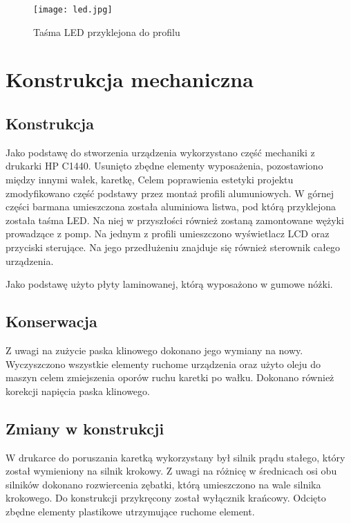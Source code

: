 \documentclass[10pt, a4paper]{article}
\begin{document}
\begin{figure}[H]
	\centering
	\texttt{[image: led.jpg]}
	\caption{Taśma LED przyklejona do profilu}
	\label{fig:LED}
\end{figure}




\section{Konstrukcja mechaniczna}

\subsection{Konstrukcja}
Jako podstawę do stworzenia urządzenia wykorzystano część mechaniki z drukarki HP C1440. Usunięto zbędne elementy wyposażenia, pozostawiono między innymi wałek, karetkę, Celem poprawienia estetyki projektu zmodyfikowano część podstawy przez montaż profili alumuniowych. W górnej części barmana umieszczona została aluminiowa listwa, pod którą przyklejona została taśma LED. Na niej w przyszłości również zostaną zamontowane wężyki prowadzące z pomp. 
Na jednym z profili umieszczono wyświetlacz LCD oraz przyciski sterujące. Na jego przedłużeniu znajduje się również sterownik całego urządzenia.

Jako podstawę użyto płyty laminowanej, którą wyposażono w gumowe nóżki. 

\subsection{Konserwacja}
Z uwagi na zużycie paska klinowego dokonano jego wymiany na nowy. Wyczyszczono wszystkie elementy ruchome urządzenia oraz użyto oleju do maszyn celem zmiejszenia oporów ruchu karetki po wałku. Dokonano również korekcji napięcia paska klinowego. 

\subsection{Zmiany w konstrukcji}
W drukarce do poruszania karetką wykorzystany był silnik prądu stałego, który został wymieniony na silnik krokowy. Z uwagi na różnicę w średnicach osi obu silników dokonano rozwiercenia zębatki, którą umieszczono na wale silnika krokowego. Do konstrukcji przykręcony został wyłącznik krańcowy.
Odcięto zbędne elementy plastikowe utrzymujące ruchome element.
\end{document}
